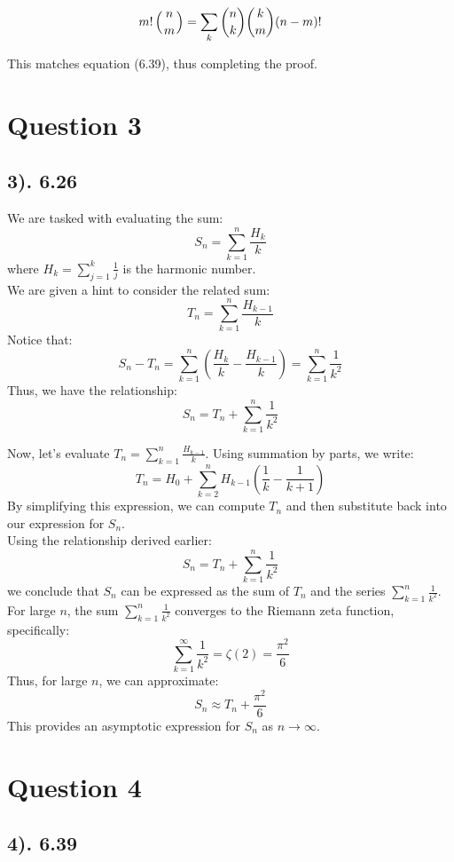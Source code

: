 \documentclass[12pt]{article}
\begin{document}
\[
m! \left( n \atop m \right) =  \sum_k  { n  \choose k } { k  \choose m }( n - m )!
\]

This matches equation (6.39), thus completing the proof.

\section*{Question 3}
\subsection*{3). 6.26}

We are tasked with evaluating the sum:
\[
S_n = \sum_{k=1}^{n} \frac{H_k}{k}
\]
where \( H_k = \sum_{j=1}^{k} \frac{1}{j} \) is the harmonic number.\\

We are given a hint to consider the related sum:
\[
T_n = \sum_{k=1}^{n} \frac{H_{k-1}}{k}
\]
Notice that:
\[
S_n - T_n = \sum_{k=1}^{n} \left( \frac{H_k}{k} - \frac{H_{k-1}}{k} \right) = \sum_{k=1}^{n} \frac{1}{k^2}
\]
Thus, we have the relationship:
\[
S_n = T_n + \sum_{k=1}^{n} \frac{1}{k^2}
\]

Now, let's evaluate \( T_n = \sum_{k=1}^{n} \frac{H_{k-1}}{k} \). Using summation by parts, we write:
\[
T_n = H_0 + \sum_{k=2}^{n} H_{k-1}\left( \frac{1}{k} - \frac{1}{k+1} \right)
\]
By simplifying this expression, we can compute \( T_n \) and then substitute back into our expression for \( S_n \).\\

Using the relationship derived earlier:
\[
S_n = T_n + \sum_{k=1}^{n} \frac{1}{k^2}
\]
we conclude that \( S_n \) can be expressed as the sum of \( T_n \) and the series \( \sum_{k=1}^{n} \frac{1}{k^2} \).\\

For large \( n \), the sum \( \sum_{k=1}^{n} \frac{1}{k^2} \) converges to the Riemann zeta function, specifically:
\[
\sum_{k=1}^{\infty} \frac{1}{k^2} = \zeta(2) = \frac{\pi^2}{6}
\]
Thus, for large \( n \), we can approximate:
\[
S_n \approx T_n + \frac{\pi^2}{6}
\]
This provides an asymptotic expression for \( S_n \) as \( n \to \infty \).

\section*{Question 4}
\subsection*{4). 6.39}
\end{document}

